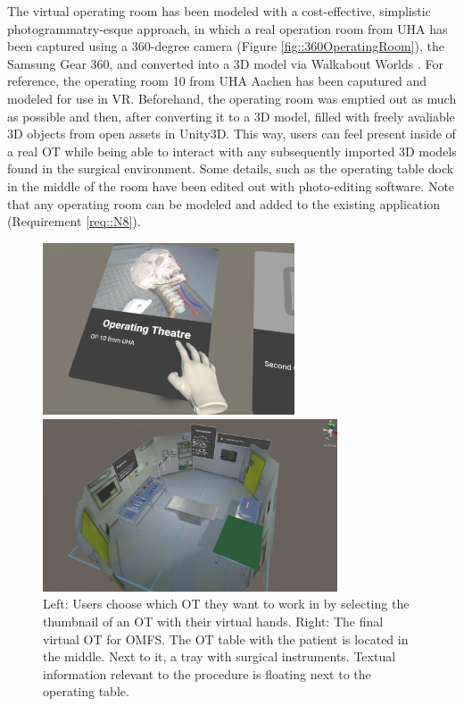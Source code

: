 The virtual operating room has been modeled with a cost-effective, simplistic photogrammatry-esque approach, in which a real operation room from UHA has been captured using a 
360-degree camera (Figure \ref{fig::360OperatingRoom}), the Samsung Gear 360, and converted into a 3D model via Walkabout Worlds \cite{WalkaboutWorlds}.
For reference, the operating room 10 from UHA Aachen has been caputured and modeled for use in VR.
Beforehand, the operating room was emptied out as much as possible and then, after converting it to a 3D model, filled with freely avaliable 3D objects from open assets in Unity3D.
This way, users can feel present inside of a real OT while being able to interact with any subsequently imported 3D models found in the surgical environment.
Some details, such as the operating table dock in the middle of the room have been edited out with photo-editing software.
Note that any operating room can be modeled and added to the existing application (Requirement \ref{req::N8}).


\begin{figure}[ht]
  \centering
  \begin{minipage}{.5\textwidth}
    \centering
    \includegraphics[width=0.99\linewidth, height=5.1cm]{images/implementation/vot/select_op.png}
  \end{minipage}%
  \begin{minipage}{.5\textwidth}
    \centering
    \includegraphics[width=0.99\linewidth, height=5.1cm]{images/implementation/vot/overview.png}
  \end{minipage}
  \caption{\label{fig::SceneSelect} Left: Users choose which OT they want to work in by selecting the thumbnail of an OT with their virtual hands. Right: The final virtual OT for OMFS. 
  The OT table with the patient is located in the middle. Next to it, a tray with surgical instruments.
  Textual information relevant to the procedure is floating next to the operating table.}
\end{figure}

